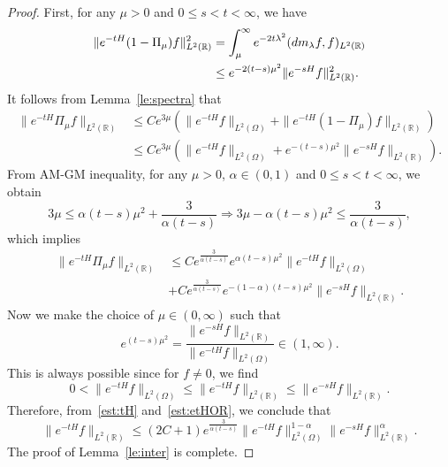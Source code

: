 \documentclass[a4paper,reqno]{amsart}
\theoremstyle{definition}
\numberwithin{equation}{section}
\newcommand{\R}{\mathbb{R}}
\def \R {{\mathbb{R} }}
\def \d {{\rm{d}}}
\begin{document}
\begin{proof}
First, for any $\mu>0$ and $0\le s<t<\infty$, we have 
\begin{equation}\label{est:tH}
\begin{aligned}
    \|e^{-tH}(1-\Pi_{\mu})f\|_{L^{2}(\R)}^{2}
    &=\int_{\mu}^{\infty}e^{-2t\lambda^{2}}(\d m_{\lambda}f,f)_{L^{2}(\R)}\\
   & \le e^{-2(t-s)\mu^{2}}\|e^{-sH}f\|_{L^{2}(\R)}^{2}.
    \end{aligned}
    \end{equation}
    It follows from Lemma~\ref{le:spectra} that 
    \begin{equation*}
    \begin{aligned}
        \|e^{-tH}\Pi_{\mu}f\|_{L^{2}(\R)}
        &\le Ce^{3\mu}\left(\|e^{-tH}f\|_{L^{2}(\Omega)}+
         \|e^{-tH}(1-\Pi_{\mu})f\|_{L^{2}(\R)}        
        \right)\\
        &\le Ce^{3\mu}\left( \|e^{-tH}f\|_{L^{2}(\Omega)}+e^{-(t-s)\mu^{2}}
         \|e^{-sH}f\|_{L^{2}(\R)}        \right).
        \end{aligned}
    \end{equation*}
    From AM-GM inequality, for any $\mu>0$, $\alpha\in (0,1)$ and $0\le s<t<\infty$, we obtain
    \begin{equation*}
        3\mu\le \alpha(t-s)\mu^{2}+\frac{3}{\alpha(t-s)}\Longrightarrow 
  3\mu- \alpha(t-s)\mu^{2}\le\frac{3}{\alpha(t-s)},
        \end{equation*}
        which implies
        \begin{equation}\label{est:etHOR}
    \begin{aligned}
        \|e^{-tH}\Pi_{\mu}f\|_{L^{2}(\R)}
        &\le Ce^{\frac{3}{\alpha(t-s)}  }      
    e^{\alpha(t-s)\mu^{2}}    
    \|e^{-tH}f\|_{L^{2}(\Omega)}\\
    &+ Ce^{\frac{3}{\alpha(t-s)}  }    e^{-(1-\alpha)(t-s)\mu^{2}}
\|e^{-sH}f\|_{L^{2}(\R)}.
        \end{aligned}
    \end{equation}
    Now we make the choice of $\mu \in(0,\infty)$ such that 
    \begin{equation*}
        e^{(t-s)\mu^{2}}=\frac{ \|e^{-sH}f\|_{L^{2}(\R)}}{ \|e^{-tH}f\|_{L^{2}(\Omega)}}\in (1,\infty).
    \end{equation*}
    This is always possible since for $f\ne 0$, we find
    \begin{equation*}
0<\|e^{-tH}f\|_{L^{2}(\Omega)}\le\|e^{-tH}f\|_{L^{2}(\R)}\le \|e^{-sH}f\|_{L^{2}(\R)}.
        \end{equation*}
        Therefore, from~\eqref{est:tH} and~\eqref{est:etHOR}, we conclude that 
        \begin{equation*}
        \|e^{-tH}f\|_{L^{2}(\R)}\le (2C+1)e^{\frac{3}{\alpha(t-s)}}\|e^{-tH}f\|_{L^{2}(\Omega)}^{1-\alpha}\|e^{-sH}f\|_{L^{2}(\R)}^{\alpha}.
    \end{equation*}
    The proof of Lemma~\ref{le:inter} is complete.
    \end{proof}
\end{document}
